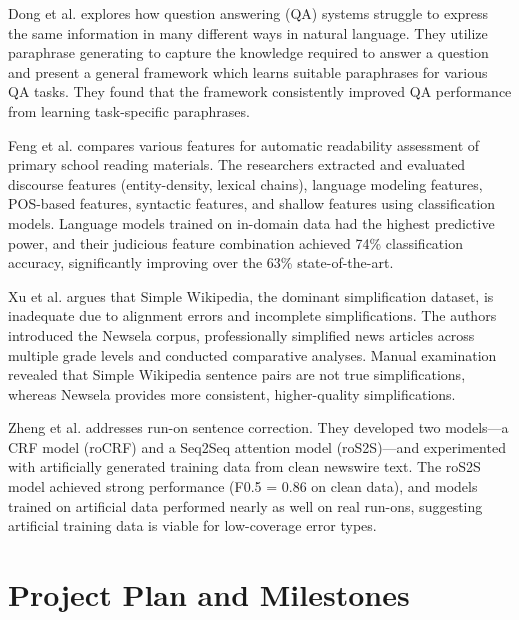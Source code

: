 \documentclass[10pt,twocolumn]{article}
\begin{document}
Dong et al.\cite{dong2017} explores how question answering (QA) systems struggle to express the same information in many different ways in natural language. They utilize paraphrase generating to capture the knowledge required to answer a question and present a general framework  which learns suitable paraphrases for various QA tasks. They found that the framework consistently improved QA performance from learning task-specific paraphrases.

Feng et al.\cite{feng2010} compares various features for automatic readability assessment of primary school reading materials. The researchers extracted and evaluated discourse features (entity-density, lexical chains), language modeling features, POS-based features, syntactic features, and shallow features using classification models. Language models trained on in-domain data had the highest predictive power, and their judicious feature combination achieved 74\% classification accuracy, significantly improving over the 63\% state-of-the-art.

Xu et al.\cite{xu2015} argues that Simple Wikipedia, the dominant simplification dataset, is inadequate due to alignment errors and incomplete simplifications. The authors introduced the Newsela corpus, professionally simplified news articles across multiple grade levels and conducted comparative analyses. Manual examination revealed that Simple Wikipedia sentence pairs are not true simplifications, whereas Newsela provides more consistent, higher-quality simplifications.

Zheng et al.\cite{zheng2018} addresses run-on sentence correction. They developed two models—a CRF model (roCRF) and a Seq2Seq attention model (roS2S)—and experimented with artificially generated training data from clean newswire text. The roS2S model achieved strong performance (F0.5 = 0.86 on clean data), and models trained on artificial data performed nearly as well on real run-ons, suggesting artificial training data is viable for low-coverage error types.

\section{Project Plan and Milestones}
\vspace{-5pt}
\end{document}
